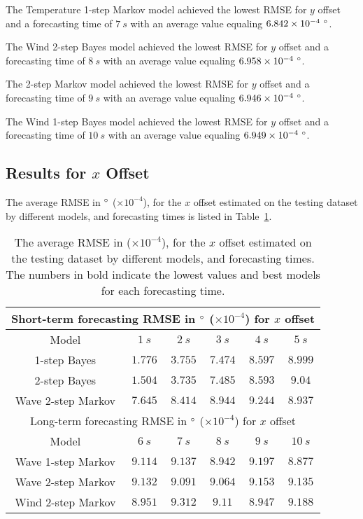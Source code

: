 \documentclass[preprint,12pt]{elsarticle}
\begin{document}
The Temperature 1-step Markov model achieved the lowest RMSE for $y$ offset and a forecasting time of $7 \ s$ with an average value equaling $6.842 \times 10^{-4} \ \degree$.

The Wind 2-step Bayes model achieved the lowest RMSE for $y$ offset and a forecasting time of $8 \ s$ with an average value equaling $6.958 \times 10^{-4} \ \degree$.

The 2-step Markov model achieved the lowest RMSE for $y$ offset and a forecasting time of $9 \ s$ with an average value equaling $6.946 \times 10^{-4} \ \degree$.

The Wind 1-step Bayes model achieved the lowest RMSE for $y$ offset and a forecasting time of $10 \ s$ with an average value equaling $6.949 \times 10^{-4} \ \degree$.

\subsection{Results for $x$ Offset}

The average RMSE in $\degree$ ($\times 10^{-4}$), for the $x$ offset estimated on the testing dataset by different models, and forecasting times is listed in Table~\ref{tab:best_longitude_RMSE}.

\begin{table}[!ht]
	\centering
	\begin{tabular}{|c|c|c|c|c|c|}
		\hline
		\multicolumn{6}{|c|}{Short-term forecasting RMSE in $\degree$ ($\times 10^{-4}$) for $x$ offset} \\ \hline
		Model & $1 \ s$ & $2 \ s$ & $3 \ s$ & $4 \ s$ & $5 \ s$ \\ \hline
		1-step Bayes & $1.776$ & $3.755$ & $\mathbf{7.474}$ & $8.597$ & $8.999$ \\ \hline
		2-step Bayes & $\mathbf{1.504}$ & $\mathbf{3.735}$ & $7.485$ & $\mathbf{8.593}$ & $9.04$ \\ \hline
		Wave 2-step Markov & $7.645$ & $8.414$ & $8.944$ & $9.244$ & $\mathbf{8.937}$ \\ \hline
		\multicolumn{6}{|c|}{Long-term forecasting RMSE in $\degree$ ($\times 10^{-4}$) for $x$ offset} \\ \hline
		Model & $6 \ s$ & $7 \ s$ & $8 \ s$ & $9 \ s$ & $10 \ s$ \\ \hline
		Wave 1-step Markov & $9.114$ & $9.137$ & $\mathbf{8.942}$ & $9.197$ & $\mathbf{8.877}$ \\ \hline
		Wave 2-step Markov & $9.132$ & $\mathbf{9.091}$ & $9.064$ & $9.153$ & $9.135$ \\ \hline
		Wind 2-step Markov & $\mathbf{8.951}$ & $9.312$ & $9.11$ & $\mathbf{8.947}$ & $9.188$ \\ \hline
	\end{tabular}
	\caption{The average RMSE in \degree ($\times 10^{-4}$), for the $x$ offset estimated on the testing dataset by different models, and forecasting times. The numbers in bold indicate the lowest values and best models for each forecasting time.}
	\label{tab:best_longitude_RMSE}
\end{table}
\end{document}
